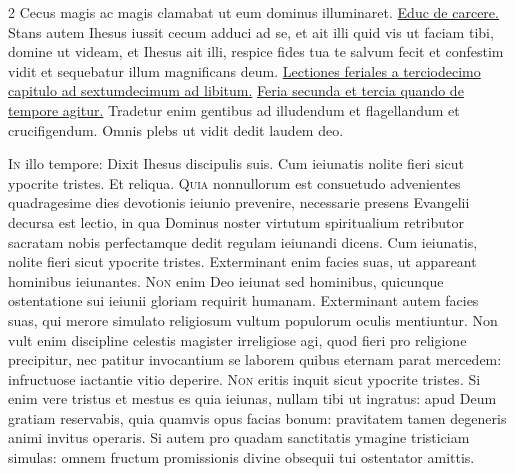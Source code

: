 \begin{multicols*}{2}
 Cecus magis ac magis clamabat ut eum dominus illuminaret. \R \hyperlink{educ-de-carcere}{Educ de carcere.}
 Stans autem Ihesus iussit cecum adduci ad se, et ait illi quid vis ut faciam tibi, domine ut videam, et Ihesus ait illi, respice fides tua te salvum fecit et confestim vidit et sequebatur illum magnificans deum.
\newline \ul{Lectiones feriales a terciodecimo capitulo ad sextumdecimum ad libitum.}
\newline \ul{Feria secunda et tercia quando de tempore agitur.}
 Tradetur enim gentibus ad illudendum et flagellandum et crucifigendum.
 Omnis plebs ut vidit dedit laudem deo.
{\color{Red} }
\par {}
\lettrine[lines=2]{\zallmancaps \color{Red} I}{n} illo tempore: Dixit Ihesus discipulis suis. Cum ieiunatis nolite fieri sicut ypocrite tristes. Et reliqua.
\lettrine[lines=2]{\zallmancaps \color{Blue} Q}{uia} nonnullorum est consuetudo advenientes quadragesime dies devotionis ieiunio prevenire, necessarie presens Evangelii decursa est lectio, in qua Dominus noster virtutum spiritualium retributor sacratam nobis perfectamque dedit regulam ieiunandi dicens. Cum ieiunatis, nolite fieri sicut ypocrite tristes. Exterminant enim facies suas, ut appareant hominibus ieiunantes.
\lettrine[lines=2]{\zallmancaps \color{Red} N}{on} enim Deo ieiunat sed hominibus, quicunque ostentatione sui ieiunii gloriam requirit humanam. Exterminant autem facies suas, qui merore simulato religiosum vultum populorum oculis mentiuntur. Non vult enim discipline celestis magister irreligiose agi, quod fieri pro religione precipitur, nec patitur invocantium se laborem quibus eternam parat mercedem: infructuose iactantie vitio deperire.
\lettrine[lines=2]{\zallmancaps \color{Blue} N}{on} eritis inquit sicut ypocrite tristes. Si enim vere tristus et mestus es quia ieiunas, nullam tibi ut ingratus: apud Deum gratiam reservabis, quia quamvis opus facias bonum: pravitatem tamen degeneris animi invitus operaris. Si autem pro quadam sanctitatis ymagine tristiciam simulas: omnem fructum promissionis divine obsequii tui ostentator amittis.

\end{multicols*}
